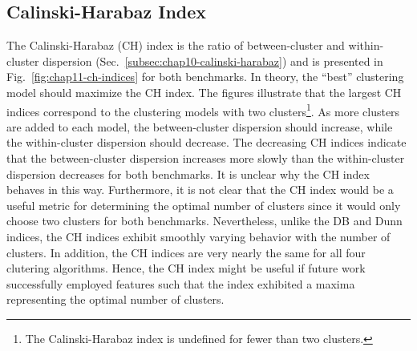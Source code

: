 \clearpage

\subsection{Calinski-Harabaz Index}
\label{subsec:chap11-ch-index}

The Calinski-Harabaz (CH) index is the ratio of between-cluster and within-cluster dispersion (Sec.~\ref{subsec:chap10-calinski-harabaz}) and is presented in Fig.~\ref{fig:chap11-ch-indices} for both benchmarks. In theory, the ``best'' clustering model should maximize the CH index. The figures illustrate that the largest CH indices correspond to the clustering models with two clusters\footnote{The Calinski-Harabaz index is undefined for fewer than two clusters.}. As more clusters are added to each model, the between-cluster dispersion should increase, while the within-cluster dispersion should decrease. The decreasing CH indices indicate that the between-cluster dispersion increases more slowly than the within-cluster dispersion decreases for both benchmarks. It is unclear why the CH index behaves in this way. Furthermore, it is not clear that the CH index would be a useful metric for determining the optimal number of clusters since it would only choose two clusters for both benchmarks. Nevertheless, unlike the DB and Dunn indices, the CH indices exhibit smoothly varying behavior with the number of clusters. In addition, the CH indices are very nearly the same for all four clutering algorithms. Hence, the CH index might be useful if future work successfully employed features such that the index exhibited a maxima representing the optimal number of clusters.

